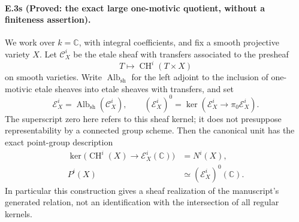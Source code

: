 \paragraph{E.3s (Proved: the exact large one-motivic quotient, without a finiteness assertion).}
We work over $k=\mathbb C$, with integral coefficients, and fix a
smooth projective variety $X$. Let $\mathcal C_X^i$ be the etale
sheaf with transfers associated to the presheaf
\[
                  T\longmapsto\operatorname{CH}^i(T\times X)
\]
on smooth varieties. Write $\operatorname{Alb}_{\mathrm{sh}}$
for the left adjoint to the inclusion of one-motivic etale
sheaves into etale sheaves with transfers, and set
\[
 \mathcal E_X^i=\operatorname{Alb}_{\mathrm{sh}}(\mathcal C_X^i),
 \qquad
 (\mathcal E_X^i)^0=\ker(\mathcal E_X^i\longrightarrow
                                      \pi_0\mathcal E_X^i).
\]
The superscript zero here refers to this sheaf kernel; it does
not presuppose representability by a connected group scheme.
Then the canonical unit has the exact point-group description
\begin{align}
 \ker\bigl(\operatorname{CH}^i(X)\longrightarrow
                           \mathcal E_X^i(\mathbb C)\bigr)
     &=N^i(X),\label{eq:E3-sheaf-kernel}\\
 P^i(X)&\simeq(\mathcal E_X^i)^0(\mathbb C).
                                      \label{eq:E3-sheaf-connected}
\end{align}
In particular this construction gives a sheaf realization of
the manuscript's generated relation, not an identification
with the intersection of all regular kernels.

